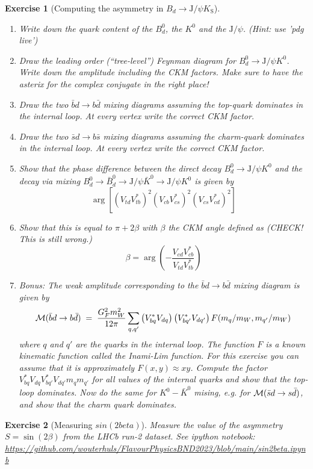 \documentclass[12pt]{article}
\newcommand{\nbexercise}[1]{\url{https://github.com/wouterhuls/FlavourPhysicsBND2023/blob/main/#1}}
\newtheorem{homeworkexercise}{Exercise}
\newenvironment{enumexercise}{
  \renewcommand{\labelenumi}{\bfseries{(\alph{enumi})}}
  \leavevmode\begin{enumerate}}{\end{enumerate}\vspace{5pt}}
\newcommand{\jpsi}{\ensuremath{\mathrm{J/}\psi}}
\newcommand{\Ks}{\ensuremath{K_\text{S}}}
\begin{document}
\begin{homeworkexercise}[Computing the asymmetry in $B_d \to \jpsi\Ks$]
  \begin{enumexercise}
  \item Write down the quark content of the $B^0_d$, the $K^0$ and the $\jpsi$. (Hint: use 'pdg live')
    
  \item Draw the leading order (``tree-level'') Feynman diagram for $B_d^0 \to \jpsi K^0$. Write down the amplitude including the CKM factors. Make sure to have the asterix for the complex conjugate in the right place!
  \item Draw the two $\bar{b}{d} \to b\bar{d}$ mixing diagrams assuming the top-quark dominates in the internal loop. At every vertex write the correct CKM factor. 
  \item Draw the two $\bar{s}{d} \to b\bar{s}$ mixing diagrams assuming the charm-quark dominates in the internal loop. At every vertex write the correct CKM factor.
  \item Show that the phase difference between the direct decay $B^0_d \to \jpsi K^0$ and the decay via mixing $B^0_d \to \bar{B}^0_d \to \jpsi \bar{K}^0 \to  \jpsi K^0$ is given by
    \[
      \arg\left[ \left( V_{td} V_{tb}^* \right)^2 \left( V_{cb} V_{cs}^*\right)^2 \left(V_{cs} V_{cd}^*\right)^2 \right]
    \]
  \item Show that this is equal to $\pi + 2\beta$ with $\beta$ the CKM angle defined as (CHECK! This is still wrong.)
    \[
      \beta = \arg\left( - \frac{V_{cd} V_{cb}^*}{V_{td} V_{tb}^*} \right)
    \]
  \item Bonus: The weak amplitude corresponding to the $\bar{b}{d} \to b\bar{d}$  mixing diagram is given by
    \[
      {\cal M}( \bar{b}{d} \to b\bar{d} ) \; = \; \frac{G_F^2 m_W^2}{12\pi} 
      \sum_{q,q'}
      \left(V_{bq}^* V_{dq}\right) \left(V_{bq'}^* V_{dq'}\right)  
      F( m_q/m_W, m_{q'}/m_W )
    \]
    where $q$ and $q'$ are the quarks in the internal loop. The function $F$ is a known kinematic function called the Inami-Lim function. For this exercise you can assume that it is approximately $F(x,y) \approx x y$. Compute the factor $ V_{bq}^* V_{dq} V_{bq'}^* V_{dq'} m_q m_{q'}$ for all values of the internal quarks and show that the top-loop dominates. Now do the same for $K^0 - \bar{K}^0$ mising, e.g. for ${\cal M}( \bar{s}{d} \to s\bar{d} )$, and show that the charm quark dominates.
    \end{enumexercise}
    
\end{homeworkexercise}


\begin{homeworkexercise}[Measuring $sin(2beta)$]

  Measure the value of the asymmetry $S = \sin(2\beta)$ from the LHCb run-2 dataset. See ipython notebook: \nbexercise{sin2beta.ipynb}
  
\end{homeworkexercise}
\end{document}
